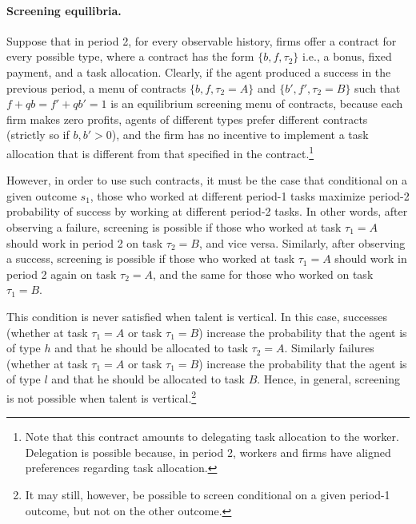 \documentclass[12pt,american]{paper}
\theoremstyle{remark}
\begin{document}


\paragraph*{Screening equilibria.}

Suppose that in period 2, for every observable history,  firms offer a contract for every possible type, where a contract has the form $\{b,f,\tau_2\}$ i.e., a bonus, fixed payment, and a task allocation. Clearly, if the agent produced a success in the previous period, a menu of contracts $\{b,f,\tau_2=A\}$ and $\{b',f',\tau_2=B\}$ such that $f+qb=f'+qb'=1$ is an equilibrium screening menu of contracts, because each firm makes zero profits, agents of different types prefer different contracts (strictly so if $b,b'>0$), and the firm has no incentive to implement a task allocation that is different from that specified in the contract.\footnote{Note that this contract amounts to delegating task allocation to the worker. Delegation is possible because, in period 2, workers and firms have aligned preferences regarding task allocation.}

However, in order to use such contracts, it must be the case that conditional on a given outcome $s_1$, those who worked at different period-1 tasks maximize period-2 probability of success by working at different period-2 tasks. In other words, after observing a failure, screening is possible if those who worked at task $\tau_1=A$ should work in period 2 on task $\tau_2=B$, and vice versa. Similarly, after observing a success, screening is possible if those who worked at task $\tau_1=A$ should work in period 2 again on task $\tau_2=A$, and the same for those who worked on task $\tau_1=B$. 

This condition is never satisfied when talent is vertical. In this case, successes (whether at task $\tau_1=A$ or task $\tau_1=B$) increase the probability that the agent is of type $h$ and that he should be allocated to task $\tau_2=A$. Similarly failures (whether at task $\tau_1=A$ or task $\tau_1=B$) increase the probability that the agent is of type $l$ and that he should be allocated to task $B$. Hence, in general, screening is not possible when talent is vertical.\footnote{It may still, however, be possible to screen conditional on a given period-1 outcome, but not on the other outcome. }
\end{document}
